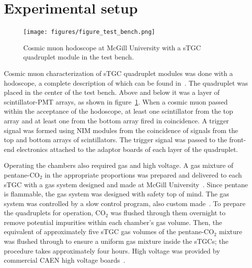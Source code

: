 \section{Experimental setup}

\begin{figure}[h]
    \centering
    \texttt{[image: figures/figure\_test\_bench.png]}
    \caption{Cosmic muon hodoscope at McGill University with a sTGC quadruplet module in the test bench.}
    \label{fig:hodoscope}
\end{figure}

Cosmic muon characterization of sTGC quadruplet modules was done with a hodoscope, a complete description of which can be found in~\cite{lefebvre_thesis}. The quadruplet was placed in the center of the test bench. Above and below it was a layer of scintillator-PMT arrays, as shown in figure~\ref{fig:hodoscope}. When a cosmic muon passed within the acceptance of the hodoscope, at least one scintillator from the top array and at least one from the bottom array fired in coincidence. A trigger signal was formed using NIM modules from the coincidence of signals from the top and bottom arrays of scintillators. The trigger signal was passed to the front-end electronics attached to the adaptor boards of each layer of the quadruplet.

Operating the chambers also required gas and high voltage. A gas mixture of pentane-CO$_{2}$ in the appropriate proportions was prepared and delivered to each sTGC with a gas system designed and made at McGill University~\cite{keyes_development_2017}. Since pentane is flammable, the gas system was designed with safety top of mind. The gas system was controlled by a slow control program, also custom made~\cite{keyes_development_2017}. To prepare the quadruplets for operation, CO$_{2}$ was flushed through them overnight to remove potential impurities within each chamber's gas volume. Then, the equivalent of approximately five sTGC gas volumes of the pentane-CO$_{2}$ mixture was flushed through to ensure a uniform gas mixture inside the sTGCs; the procedure takes approximately four hours. High voltage was provided by commercial CAEN high voltage boards~\cite{keyes_development_2017}. 



